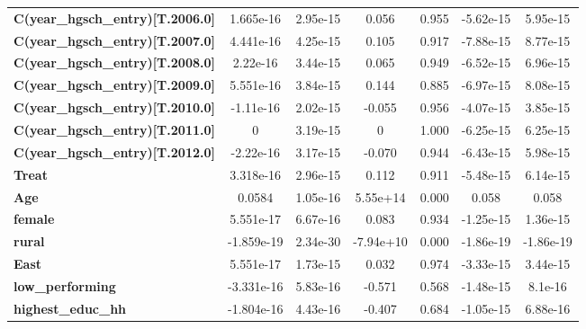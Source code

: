 \begin{center}
\begin{tabular}{lcccccc}
\textbf{C(year\_hgsch\_entry)[T.2006.0]} &    1.665e-16  &     2.95e-15     &     0.056  &         0.955        &    -5.62e-15    &     5.95e-15     \\
\textbf{C(year\_hgsch\_entry)[T.2007.0]} &    4.441e-16  &     4.25e-15     &     0.105  &         0.917        &    -7.88e-15    &     8.77e-15     \\
\textbf{C(year\_hgsch\_entry)[T.2008.0]} &     2.22e-16  &     3.44e-15     &     0.065  &         0.949        &    -6.52e-15    &     6.96e-15     \\
\textbf{C(year\_hgsch\_entry)[T.2009.0]} &    5.551e-16  &     3.84e-15     &     0.144  &         0.885        &    -6.97e-15    &     8.08e-15     \\
\textbf{C(year\_hgsch\_entry)[T.2010.0]} &    -1.11e-16  &     2.02e-15     &    -0.055  &         0.956        &    -4.07e-15    &     3.85e-15     \\
\textbf{C(year\_hgsch\_entry)[T.2011.0]} &            0  &     3.19e-15     &         0  &         1.000        &    -6.25e-15    &     6.25e-15     \\
\textbf{C(year\_hgsch\_entry)[T.2012.0]} &    -2.22e-16  &     3.17e-15     &    -0.070  &         0.944        &    -6.43e-15    &     5.98e-15     \\
\textbf{Treat}                           &    3.318e-16  &     2.96e-15     &     0.112  &         0.911        &    -5.48e-15    &     6.14e-15     \\
\textbf{Age}                             &       0.0584  &     1.05e-16     &  5.55e+14  &         0.000        &        0.058    &        0.058     \\
\textbf{female}                          &    5.551e-17  &     6.67e-16     &     0.083  &         0.934        &    -1.25e-15    &     1.36e-15     \\
\textbf{rural}                           &   -1.859e-19  &     2.34e-30     & -7.94e+10  &         0.000        &    -1.86e-19    &    -1.86e-19     \\
\textbf{East}                            &    5.551e-17  &     1.73e-15     &     0.032  &         0.974        &    -3.33e-15    &     3.44e-15     \\
\textbf{low\_performing}                 &   -3.331e-16  &     5.83e-16     &    -0.571  &         0.568        &    -1.48e-15    &      8.1e-16     \\
\textbf{highest\_educ\_hh}               &   -1.804e-16  &     4.43e-16     &    -0.407  &         0.684        &    -1.05e-15    &     6.88e-16     \\

\end{tabular}
\end{center}
